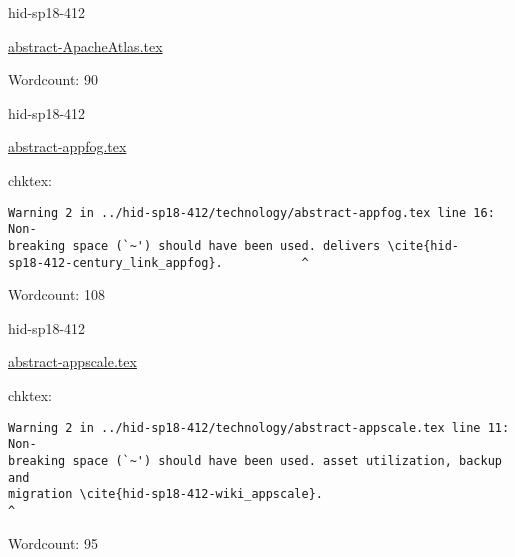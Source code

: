 

\begin{IU}

hid-sp18-412

\href{https://github.com/cloudmesh-community/hid-sp18-412/blob/master//technology/abstract-ApacheAtlas.tex}{abstract-ApacheAtlas.tex}

 

Wordcount: 90

\end{IU}



\begin{IU}

hid-sp18-412

\href{https://github.com/cloudmesh-community/hid-sp18-412/blob/master//technology/abstract-appfog.tex}{abstract-appfog.tex}

 
chktex:
\begin{tiny}
\begin{verbatim}
Warning 2 in ../hid-sp18-412/technology/abstract-appfog.tex line 16: Non-
breaking space (`~') should have been used. delivers \cite{hid-
sp18-412-century_link_appfog}.           ^
\end{verbatim}
\end{tiny}

Wordcount: 108

\end{IU}



\begin{IU}

hid-sp18-412

\href{https://github.com/cloudmesh-community/hid-sp18-412/blob/master//technology/abstract-appscale.tex}{abstract-appscale.tex}

 
chktex:
\begin{tiny}
\begin{verbatim}
Warning 2 in ../hid-sp18-412/technology/abstract-appscale.tex line 11: Non-
breaking space (`~') should have been used. asset utilization, backup and
migration \cite{hid-sp18-412-wiki_appscale}.
^
\end{verbatim}
\end{tiny}

Wordcount: 95

\end{IU}

